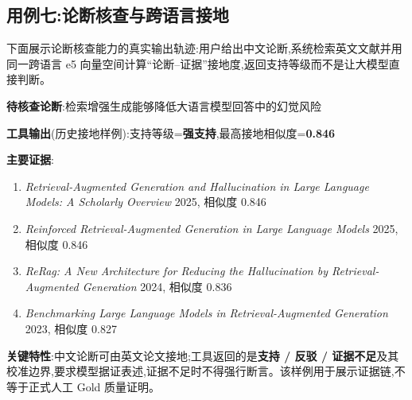 \subsection{用例七:论断核查与跨语言接地}
下面展示论断核查能力的真实输出轨迹:用户给出中文论断,系统检索英文文献并用同一跨语言 e5 向量空间计算“论断--证据”接地度,返回支持等级而不是让大模型直接判断。
\begin{plainbox}
\textbf{待核查论断}:检索增强生成能够降低大语言模型回答中的幻觉风险\par\vspace{2pt}
\textbf{工具输出}(历史接地样例):支持等级=\textbf{强支持},最高接地相似度=\textbf{0.846}\par\vspace{2pt}
\textbf{主要证据}:
\begin{enumerate}[itemsep=1pt]
\item \emph{Retrieval-Augmented Generation and Hallucination in Large Language Models: A Scholarly Overview} \hfill 2025, 相似度 0.846
\item \emph{Reinforced Retrieval-Augmented Generation in Large Language Models} \hfill 2025, 相似度 0.846
\item \emph{ReRag: A New Architecture for Reducing the Hallucination by Retrieval-Augmented Generation} \hfill 2024, 相似度 0.836
\item \emph{Benchmarking Large Language Models in Retrieval-Augmented Generation} \hfill 2023, 相似度 0.827
\end{enumerate}
\textbf{关键特性}:中文论断可由英文论文接地;工具返回的是\textbf{支持 / 反驳 / 证据不足}及其校准边界,要求模型据证表述,证据不足时不得强行断言。该样例用于展示证据链,不等于正式人工 Gold 质量证明。
\end{plainbox}

